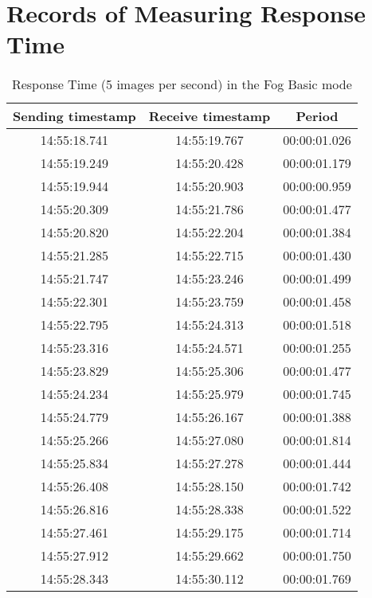 \chapter{Records of Measuring Response Time}

\begin{table}[h!]
\centering
\begin{tabular}{ |c|c|c| } 
 \hline
 Sending timestamp &    Receive timestamp &    Period\\
 \hline
14:55:18.741 &    14:55:19.767 &    00:00:01.026\\
14:55:19.249 &    14:55:20.428 &    00:00:01.179\\
14:55:19.944 &    14:55:20.903 &    00:00:00.959\\
14:55:20.309 &    14:55:21.786 &    00:00:01.477\\
14:55:20.820 &    14:55:22.204 &    00:00:01.384\\
14:55:21.285 &    14:55:22.715 &    00:00:01.430\\
14:55:21.747 &    14:55:23.246 &    00:00:01.499\\
14:55:22.301 &    14:55:23.759 &    00:00:01.458\\
14:55:22.795 &    14:55:24.313 &    00:00:01.518\\
14:55:23.316 &    14:55:24.571 &    00:00:01.255\\
14:55:23.829 &    14:55:25.306 &    00:00:01.477\\
14:55:24.234 &    14:55:25.979 &    00:00:01.745\\
14:55:24.779 &    14:55:26.167 &    00:00:01.388\\
14:55:25.266 &    14:55:27.080 &    00:00:01.814\\
14:55:25.834 &    14:55:27.278 &    00:00:01.444\\
14:55:26.408 &    14:55:28.150 &    00:00:01.742\\
14:55:26.816 &    14:55:28.338 &    00:00:01.522\\
14:55:27.461 &    14:55:29.175 &    00:00:01.714\\
14:55:27.912 &    14:55:29.662 &    00:00:01.750\\
14:55:28.343 &    14:55:30.112 &    00:00:01.769\\
 \hline
\end{tabular}
\caption{Response Time (5 images per second) in the Fog Basic mode}
\label{table:measure_response_time}
\end{table}


